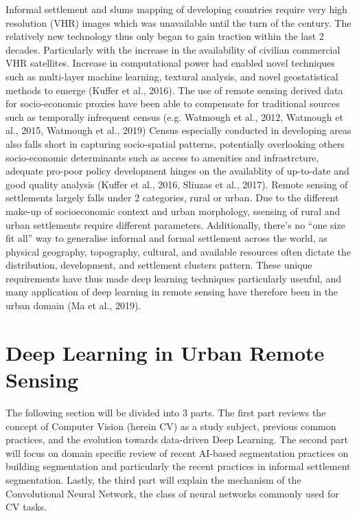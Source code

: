 \documentclass[11pt, a4paper, twoside]{report}
\begin{document}
Informal settlement and slums mapping of developing countries require very high resolution (VHR) images which was unavailable until the turn of the century. The relatively new technology thus only began to gain traction within the last 2 decades. Particularly with the increase in the availability of civilian commercial VHR satellites. Increase in computational power had enabled novel techniques such as multi-layer machine learning, textural analysis, and novel geostatistical methods to emerge (Kuffer et al., 2016). The use of remote sensing derived data for socio-economic proxies have been able to compensate for traditional sources such as temporally infrequent census (e.g. Watmough et al., 2012, Watmough et al., 2015, Watmough et al., 2019) Census especially conducted in developing areas also falls short in capturing socio-spatial patterns, potentially overlooking others socio-economic determinants such as access to amenities and infrastrcture, adequate pro-poor policy development hinges on the availablity of up-to-date and good quality analysis (Kuffer et al., 2016, Sliuzas et al., 2017). Remote sensing of settlements largely falls under 2 categories, rural or urban. Due to the different make-up of socioeconomic context and urban morphology, ssensing of rural and urban settlements require different parameters. Additionally, there’s no “one size fit all” way to generalise informal and formal settlement across the world, as physical geography, topography, cultural, and available resources often dictate the distribution, development, and settlement clusters pattern. These unique requirements have thus made deep learning techniques particularly useuful, and many application of deep learning in remote sensing have therefore been in the urban domain (Ma et al., 2019).

\section{Deep Learning in Urban Remote Sensing}\label{DLinRS}

The following section will be divided into 3 parts. The first part reviews the concept of Computer Vision (herein CV) as a study subject, previous common practices, and the evolution towards data-driven Deep Learning. The second part will focus on domain specific review of recent AI-based segmentation practices on building segmentation and particularly the recent practices in informal settlement segmentation. Lastly, the third part will explain the mechanism of the Convolutional Neural Network, the class of neural networks commonly used for CV tasks.\\\par
\end{document}
